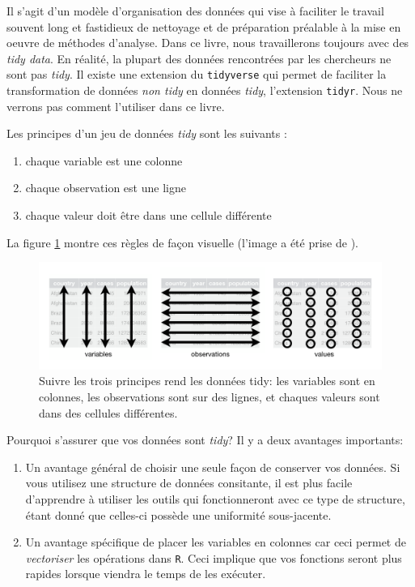 \documentclass[]{book}
\providecommand{\tightlist}{%
  \setlength{\itemsep}{0pt}\setlength{\parskip}{0pt}}
\begin{document}
Il s'agit d'un modèle d'organisation des données qui vise à faciliter le
travail souvent long et fastidieux de nettoyage et de préparation
préalable à la mise en oeuvre de méthodes d'analyse. Dans ce livre, nous
travaillerons toujours avec des \emph{tidy data}. En réalité, la plupart
des données rencontrées par les chercheurs ne sont pas \emph{tidy}. Il
existe une extension du \texttt{tidyverse} qui permet de faciliter la
transformation de données \emph{non tidy} en données \emph{tidy},
l'extension \texttt{tidyr}. Nous ne verrons pas comment l'utiliser dans
ce livre.

Les principes d'un jeu de données \emph{tidy} sont les suivants :

\begin{enumerate}
\def\labelenumi{\arabic{enumi}.}
\tightlist
\item
  chaque variable est une colonne
\item
  chaque observation est une ligne
\item
  chaque valeur doit être dans une cellule différente
\end{enumerate}

La figure \ref{fig:tidy-structure} montre ces règles de façon visuelle
(l'image a été prise de \citep{wickham2017}).

\begin{figure}

{\centering \includegraphics[width=1\linewidth]{images/tidy-1} 

}

\caption{Suivre les trois principes rend les données tidy: les variables sont en colonnes, les observations sont sur des lignes, et chaques valeurs sont dans des cellules différentes.}\label{fig:tidy-structure}
\end{figure}

Pourquoi s'assurer que vos données sont \emph{tidy}? Il y a deux
avantages importants:

\begin{enumerate}
\def\labelenumi{\arabic{enumi}.}
\item
  Un avantage général de choisir une seule façon de conserver vos
  données. Si vous utilisez une structure de données consitante, il est
  plus facile d'apprendre à utiliser les outils qui fonctionneront avec
  ce type de structure, étant donné que celles-ci possède une uniformité
  sous-jacente.
\item
  Un avantage spécifique de placer les variables en colonnes car ceci
  permet de \emph{vectoriser} les opérations dans \texttt{R}. Ceci
  implique que vos fonctions seront plus rapides lorsque viendra le
  temps de les exécuter.
\end{enumerate}
\end{document}
